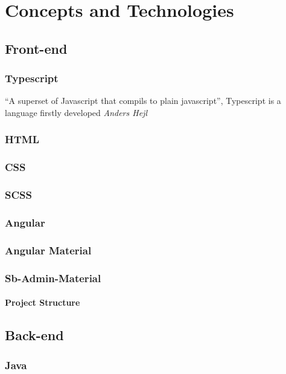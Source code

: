 \chapter{Concepts and Technologies}
\label{cha:concepts}

\section{Front-end}
\label{cha:concepts:sec:frontend}

\subsection{Typescript}
``A superset of Javascript that compils to plain javascript''\cite{tswebsite}, Typescript is a language firstly developed \textit{Anders Hejl}
\subsection{HTML}
\subsection{CSS}
\subsection{SCSS}
\subsection{Angular}
\subsection{Angular Material}
\subsection{Sb-Admin-Material}
\subsubsection{Project Structure}

\section{Back-end}
\label{cha:concepts:sec:backend}

\subsection{Java}
